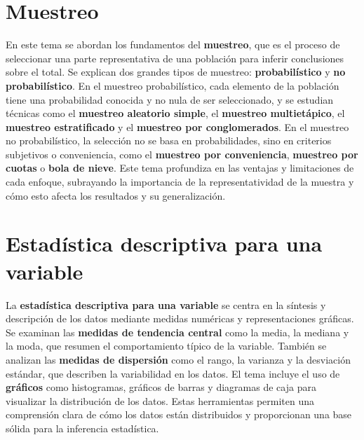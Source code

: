 \documentclass[
  letterpaper,
  DIV=11,
  numbers=noendperiod]{scrreprt}
\begin{document}
\section*{Muestreo}\label{muestreo}


En este tema se abordan los fundamentos del \textbf{muestreo}, que es el
proceso de seleccionar una parte representativa de una población para
inferir conclusiones sobre el total. Se explican dos grandes tipos de
muestreo: \textbf{probabilístico} y \textbf{no probabilístico}. En el
muestreo probabilístico, cada elemento de la población tiene una
probabilidad conocida y no nula de ser seleccionado, y se estudian
técnicas como el \textbf{muestreo aleatorio simple}, el \textbf{muestreo
multietápico}, el \textbf{muestreo estratificado} y el \textbf{muestreo
por conglomerados}. En el muestreo no probabilístico, la selección no se
basa en probabilidades, sino en criterios subjetivos o conveniencia,
como el \textbf{muestreo por conveniencia}, \textbf{muestreo por cuotas}
o \textbf{bola de nieve}. Este tema profundiza en las ventajas y
limitaciones de cada enfoque, subrayando la importancia de la
representatividad de la muestra y cómo esto afecta los resultados y su
generalización.

\section*{Estadística descriptiva para una
variable}\label{estaduxedstica-descriptiva-para-una-variable}


La \textbf{estadística descriptiva para una variable} se centra en la
síntesis y descripción de los datos mediante medidas numéricas y
representaciones gráficas. Se examinan las \textbf{medidas de tendencia
central} como la media, la mediana y la moda, que resumen el
comportamiento típico de la variable. También se analizan las
\textbf{medidas de dispersión} como el rango, la varianza y la
desviación estándar, que describen la variabilidad en los datos. El tema
incluye el uso de \textbf{gráficos} como histogramas, gráficos de barras
y diagramas de caja para visualizar la distribución de los datos. Estas
herramientas permiten una comprensión clara de cómo los datos están
distribuidos y proporcionan una base sólida para la inferencia
estadística.
\end{document}
